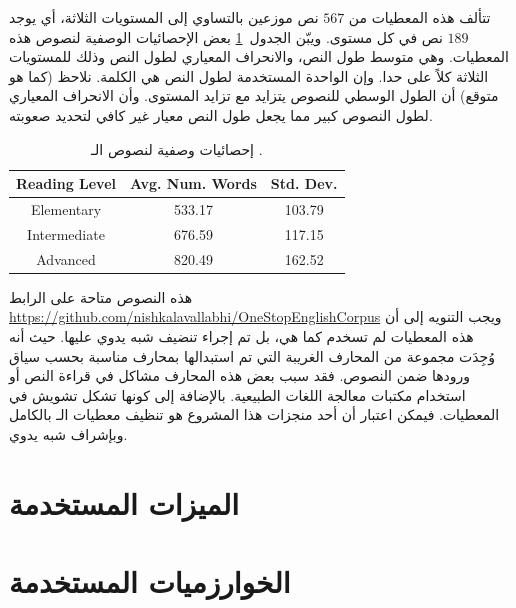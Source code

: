 تتألف هذه المعطيات من $567$ نص موزعين بالتساوي إلى المستويات الثلاثة،
أي يوجد $189$ نص في كل مستوى.
ويبّن الجدول~\ref{tbl:corpus:ose_stat} بعض الإحصائيات الوصفية لنصوص هذه المعطيات.
وهي متوسط طول النص، والانحراف المعياري لطول النص وذلك للمستويات الثلاثة كلاً على حدا.
وإن الواحدة المستخدمة لطول النص هي الكلمة.
نلاحظ (كما هو متوقع) أن الطول الوسطي للنصوص يتزايد مع تزايد المستوى.
وأن الانحراف المعياري لطول النصوص كبير مما يجعل طول النص معيار غير كافي لتحديد صعوبته.

\begin{table}[htb]
	\centering
	{
		\setlength{\tabcolsep}{0.5em} %
		\renewcommand{\arraystretch}{1.4}%
		
		\begin{tabular}{|c|c|c|}
			\hline
			
			\textbf{Reading Level} &
			\textbf{Avg. Num. Words} &
			\textbf{Std. Dev.}\\
			\hline 
			
			Elementary &
			533.17 &
			103.79 \\
			\hline
			
			Intermediate &
			676.59 &
			117.15 \\
			\hline
			
			Advanced &
			820.49 &
			162.52 \\
			\hline
			
		\end{tabular}
	}
	\caption{%
		إحصائيات وصفية لنصوص الـ .
	}
	\label{tbl:corpus:ose_stat}
\end{table}

هذه النصوص متاحة على الرابط
\url{https://github.com/nishkalavallabhi/OneStopEnglishCorpus}
ويجب التنويه إلى أن هذه المعطيات لم تسخدم كما هي، بل تم إجراء تنضيف شبه يدوي عليها.
حيث أنه وُجِدَت مجموعة من المحارف الغريبة التي تم استبدالها بمحارف مناسبة بحسب سياق ورودها ضمن النصوص.
فقد سبب بعض هذه المحارف مشاكل في قراءة النص أو استخدام مكتبات معالجة اللغات الطبيعية.
بالإضافة إلى كونها تشكل تشويش في المعطيات.
فيمكن اعتبار أن أحد منجزات هذا المشروع هو تنظيف معطيات الـ  بالكامل وبإشراف شبه يدوي.

\section{الميزات المستخدمة}
\label{sec:sys:features}



\section{الخوارزميات المستخدمة}




